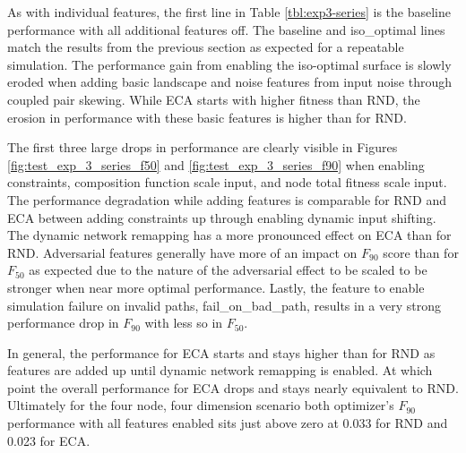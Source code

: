 \documentclass[a4paper]{article}
\begin{document}
As with individual features, the first line in Table \ref{tbl:exp3-series} is the baseline performance with all  additional features off. The baseline and iso\_optimal lines match the results from the previous section as expected for a repeatable simulation. The performance gain from enabling the iso-optimal surface is slowly eroded when adding basic landscape and noise features from input noise through coupled pair skewing. While ECA starts with higher fitness than RND, the erosion in performance with these basic features is higher than for RND.

The first three large drops in performance are clearly visible in Figures \ref{fig:test_exp_3_series_f50} and \ref{fig:test_exp_3_series_f90} when enabling constraints, composition function scale input, and node total fitness scale input. The performance degradation while adding features is comparable for RND and ECA between adding constraints up through enabling dynamic input shifting. The dynamic network remapping has a more pronounced effect on ECA than for RND. Adversarial features generally have more of an impact on $F_{90}$ score than for $F_{50}$ as expected due to the nature of the adversarial effect to be scaled to be stronger when near more optimal performance. Lastly, the feature to enable simulation failure on invalid paths, fail\_on\_bad\_path, results in a very strong performance drop in $F_{90}$ with less so in $F_{50}$.

In general, the performance for ECA starts and stays higher than for RND as features are added up until dynamic network remapping is enabled. At which point the overall performance for ECA drops and stays nearly equivalent to RND. Ultimately for the four node, four dimension scenario both optimizer's $F_{90}$ performance with all features enabled sits just above zero at 0.033 for RND and 0.023 for ECA.
\end{document}
